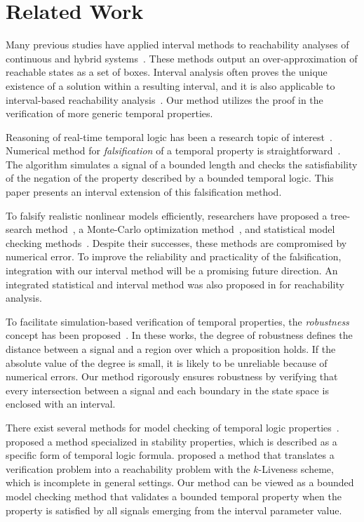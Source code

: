 \documentclass[paper]{ieice}
\begin{document}
\section{Related Work} \label{s:related}

Many previous studies have applied interval methods to reachability analyses of continuous and hybrid systems~\cite{Eggers2008,Collins2008,Ramdani2011,Ishii2011,Chen2012,Gao2013:SMODE}.
These methods output an over-approximation of reachable states as a set of boxes. 
Interval analysis often proves the unique existence of a solution within a resulting interval, and
it is also applicable to interval-based reachability analysis~\cite{Ishii2011,Goubault2014}.
Our method utilizes the proof in the verification of more generic temporal properties.



Reasoning of real-time temporal logic has been a research topic of interest~\cite{Alur1996,Shultz1997}. 
Numerical method for \emph{falsification} of a temporal property is straightforward~\cite{Maler2003}.
The algorithm simulates a signal of a bounded length and checks the satisfiability of the negation of the property described by a bounded temporal logic.
This paper presents an interval extension of this falsification method.

To falsify realistic nonlinear models efficiently, researchers have proposed a tree-search method~\cite{Plaku2009}, a Monte-Carlo optimization method~\cite{Nghiem2010}, and statistical model checking methods~\cite{David2012,Zuliani2013}.
Despite their successes, these methods are compromised by numerical error. To improve the reliability and practicality of the falsification, integration with our interval method will be a promising future direction.
An integrated statistical and interval method was also proposed in \cite{Wang2014} for reachability analysis.

To facilitate simulation-based verification of temporal properties, the \emph{robustness} concept has been proposed~\cite{Fainekos2006a,Donze2010,Nghiem2010}.
In these works, the degree of robustness defines the distance between a signal and a region over which a proposition holds.
If the absolute value of the degree is small, it is likely to be unreliable because of numerical errors.
Our method rigorously ensures robustness by verifying that every intersection between a signal and each boundary in the state space is enclosed with an interval.

There exist several methods for model checking of temporal logic properties~\cite{Podelski2006,Cimatti2014}.
\cite{Podelski2006} proposed a method specialized in stability properties, which is described as a specific form of temporal logic formula.
\cite{Cimatti2014} proposed a method that translates a verification problem into a reachability problem with the $k$-Liveness scheme,
which is incomplete in general settings.
Our method can be viewed as a bounded model checking method that validates a bounded temporal property when the property is satisfied by all signals emerging from the interval parameter value.
\end{document}
